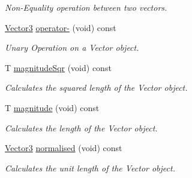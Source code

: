 \begin{DoxyCompactItemize}
\begin{DoxyCompactList}\small\item\em Non-\/\+Equality operation between two vectors. \end{DoxyCompactList}\item 
\hyperlink{classsparky_1_1_vector3}{Vector3} \hyperlink{classsparky_1_1_vector3_a16c9e3d28efaa547827b71d2eab4d49d}{operator-\/} (void) const 
\begin{DoxyCompactList}\small\item\em Unary Operation on a Vector object. \end{DoxyCompactList}\item 
T \hyperlink{classsparky_1_1_vector3_ab0ea0830dce3acfec5cb9f1de1042db6}{magnitude\+Sqr} (void) const 
\begin{DoxyCompactList}\small\item\em Calculates the squared length of the Vector object. \end{DoxyCompactList}\item 
T \hyperlink{classsparky_1_1_vector3_aca93f8c21ac983ea4585559751bed49c}{magnitude} (void) const 
\begin{DoxyCompactList}\small\item\em Calculates the length of the Vector object. \end{DoxyCompactList}\item 
\hyperlink{classsparky_1_1_vector3}{Vector3} \hyperlink{classsparky_1_1_vector3_a1a19c4257d12e5e1178a6c75b905ea35}{normalised} (void) const 
\begin{DoxyCompactList}\small\item\em Calculates the unit length of the Vector object. \end{DoxyCompactList}\end{DoxyCompactItemize}

